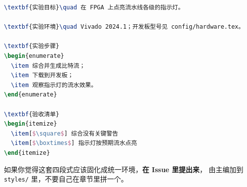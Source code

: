 \begin{lstlisting}[language=TeX]
\textbf{实验目标}\quad 在 FPGA 上点亮流水线各级的指示灯。

\textbf{实验环境}\quad Vivado 2024.1；开发板型号见 config/hardware.tex。

\textbf{实验步骤}
\begin{enumerate}
  \item 综合并生成比特流；
  \item 下载到开发板；
  \item 观察指示灯的流水效果。
\end{enumerate}

\textbf{验收清单}
\begin{itemize}
  \item[$\square$] 综合没有关键警告
  \item[$\boxtimes$] 指示灯按预期流水点亮
\end{itemize}
\end{lstlisting}

如果你觉得这套四段式应该固化成统一环境，\textbf{在 Issue 里提出来}，
由主编加到 \texttt{styles/} 里，不要自己在章节里拼一个。
